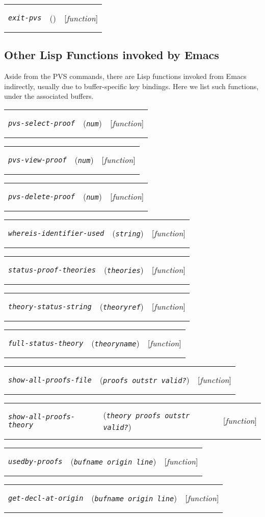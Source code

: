 \documentclass[12pt]{book}
\makeatletter
\newenvironment{function}[3]%
{\par\noindent\begin{boxedminipage}{\textwidth}%
 \par\noindent\begin{tabularx}{\linewidth}{l>{\raggedright}Xr}%
 \functionhtgt{#1}&(\texttt{\textit{#2}})&[\emph{#3}]%
 \end{tabularx}\par\flushright\begin{minipage}{.97\textwidth}}
{\end{minipage}\end{boxedminipage}}
\newcommand{\functionnm}[1]{\texttt{\textit{#1}}}
\newcommand{\functionhtgt}[1]{\hypertarget{#1}{\functionnm{#1}}\index{#1@\functionnm{#1}|underline}}
\newenvironment{lispfunction}[2]%
{\begin{function}{#1}{#2}{function}}{\end{function}}
\makeatother
\begin{document}
\begin{lispfunction}{exit-pvs}{}
\end{lispfunction}


\subsection{Other Lisp Functions invoked by Emacs}

Aside from the PVS commands, there are Lisp functions invoked from Emacs
indirectly, usually due to buffer-specific key bindings.  Here we list
such functions, under the associated buffers.

\begin{lispfunction}{pvs-select-proof}{num}
\end{lispfunction}

\begin{lispfunction}{pvs-view-proof}{num}
\end{lispfunction}

\begin{lispfunction}{pvs-delete-proof}{num}
\end{lispfunction}

\begin{lispfunction}{whereis-identifier-used}{string}
\end{lispfunction}

\begin{lispfunction}{status-proof-theories}{theories}
\end{lispfunction}

\begin{lispfunction}{theory-status-string}{theoryref}
\end{lispfunction}

\begin{lispfunction}{full-status-theory}{theoryname}
\end{lispfunction}

\begin{lispfunction}{show-all-proofs-file}{proofs outstr valid?}
\end{lispfunction}

\begin{lispfunction}{show-all-proofs-theory}{theory proofs outstr valid?}
\end{lispfunction}

\begin{lispfunction}{usedby-proofs}{bufname origin line}
\end{lispfunction}

\begin{lispfunction}{get-decl-at-origin}{bufname origin line}
\end{lispfunction}
\end{document}
